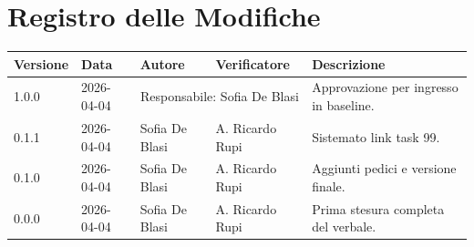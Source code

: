 \section*{Registro delle Modifiche}
\begin{table}[ht]
	\centering
	\renewcommand{\arraystretch}{1.5}
	\begin{longtable}{>{\ttfamily\small}l l l l >{\raggedright\arraybackslash}p{5cm}}
		\toprule
		\textbf{Versione} & \textbf{Data} & \textbf{Autore} & \textbf{Verificatore} & \textbf{Descrizione} \\
		\midrule
		1.0.0 & 2026-04-04 & \multicolumn{2}{c}{Responsabile: Sofia De Blasi} & Approvazione per ingresso in baseline. \\
		0.1.1 & 2026-04-04 & Sofia De Blasi & A. Ricardo Rupi & Sistemato link task 99. \\
		0.1.0 & 2026-04-04 & Sofia De Blasi & A. Ricardo Rupi & Aggiunti pedici e versione finale. \\
		0.0.0 & 2026-04-04 & Sofia De Blasi & A. Ricardo Rupi & Prima stesura completa del verbale. \\
		\bottomrule
	\end{longtable}
\end{table}